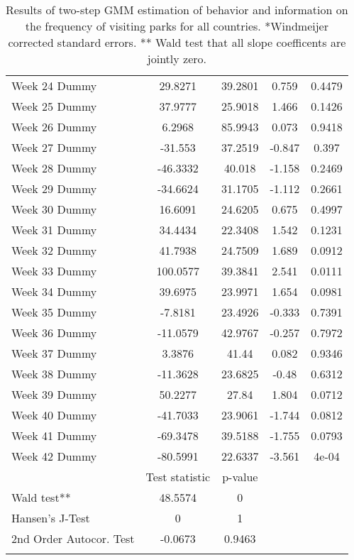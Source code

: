 \begin{longtable}{lcccc}
  Week 24 Dummy & 29.8271 & 39.2801 & 0.759 & 0.4479 \\ 
  Week 25 Dummy & 37.9777 & 25.9018 & 1.466 & 0.1426 \\ 
  Week 26 Dummy & 6.2968 & 85.9943 & 0.073 & 0.9418 \\ 
  Week 27 Dummy & -31.553 & 37.2519 & -0.847 & 0.397 \\ 
  Week 28 Dummy & -46.3332 & 40.018 & -1.158 & 0.2469 \\ 
  Week 29 Dummy & -34.6624 & 31.1705 & -1.112 & 0.2661 \\ 
  Week 30 Dummy & 16.6091 & 24.6205 & 0.675 & 0.4997 \\ 
  Week 31 Dummy & 34.4434 & 22.3408 & 1.542 & 0.1231 \\ 
  Week 32 Dummy & 41.7938 & 24.7509 & 1.689 & 0.0912 \\ 
  Week 33 Dummy & 100.0577 & 39.3841 & 2.541 & 0.0111 \\ 
  Week 34 Dummy & 39.6975 & 23.9971 & 1.654 & 0.0981 \\ 
  Week 35 Dummy & -7.8181 & 23.4926 & -0.333 & 0.7391 \\ 
  Week 36 Dummy & -11.0579 & 42.9767 & -0.257 & 0.7972 \\ 
  Week 37 Dummy & 3.3876 & 41.44 & 0.082 & 0.9346 \\ 
  Week 38 Dummy & -11.3628 & 23.6825 & -0.48 & 0.6312 \\ 
  Week 39 Dummy & 50.2277 & 27.84 & 1.804 & 0.0712 \\ 
  Week 40 Dummy & -41.7033 & 23.9061 & -1.744 & 0.0812 \\ 
  Week 41 Dummy & -69.3478 & 39.5188 & -1.755 & 0.0793 \\ 
  Week 42 Dummy & -80.5991 & 22.6337 & -3.561 & 4e-04 \\ 
   & Test statistic & p-value &  &  \\ 
  Wald test** & 48.5574 & 0 &  &  \\ 
  Hansen's J-Test & 0 & 1 &  &  \\ 
  2nd Order Autocor. Test & -0.0673 & 0.9463 &  &  \\ 
   \bottomrule
\caption{Results of two-step GMM estimation of behavior and information on the frequency of visiting parks for all countries. *Windmeijer corrected standard errors. ** Wald test that all slope coefficents are jointly zero.} 
\label{tab_results:parks_full}
\end{longtable}
\endgroup
